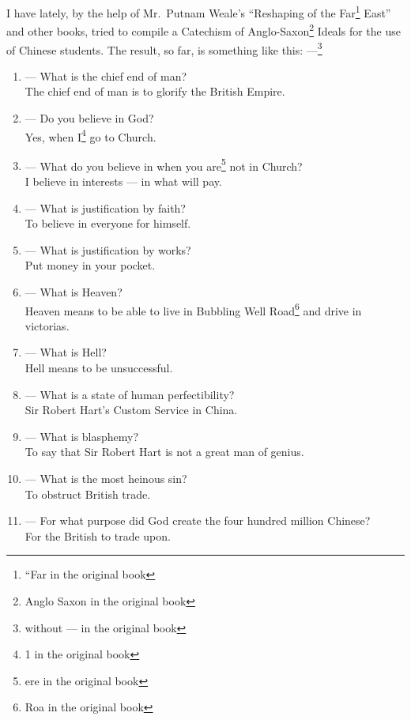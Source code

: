 I have lately, by the help of Mr.~Putnam Weale's  ``Reshaping of the Far\footnote{``Far in the original book} East'' and other books, tried to compile a Catechism of Anglo-Saxon\footnote{Anglo Saxon in the original book} Ideals for the use of Chinese students.
The result, so far, is something like this: ---\footnote{without --- in the original book}
\begin{enumerate}
    \item --- What is the chief end of man? \\ The chief end of man is to glorify the British Empire.
    \item --- Do you believe in God? \\ Yes, when I\footnote{1 in the original book} go to Church.
    \item --- What do you believe in when you are\footnote{ere in the original book} not in Church? \\ I believe in interests --- in what will pay.
    \item --- What is justification by faith? \\ To believe in everyone for himself.
    \item --- What is justification by works? \\ Put money in your pocket.
    \item --- What is Heaven? \\ Heaven means to be able to live in Bubbling Well Road\footnote{Roa in the original book} and drive in victorias.
    \item --- What is Hell? \\ Hell means to be unsuccessful.
    \item --- What is a state of human perfectibility? \\ Sir Robert Hart's  Custom  Service in China.
    \item --- What is blasphemy? \\ To say that Sir Robert Hart is not a great man of genius.
    \item --- What is the most heinous sin? \\ To obstruct British trade.
    \item --- For what purpose did God create the four hundred million Chinese? \\ For the British to trade upon.

\end{enumerate}
